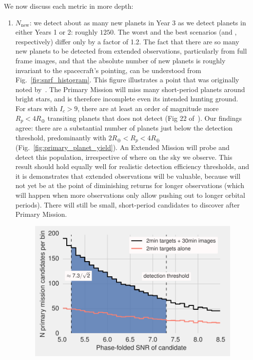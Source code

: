 We now discuss each metric in more depth:
\begin{enumerate}
	\item $N_\mathrm{new}$: we detect about as many new planets in Year 3 as we detect planets in either Years 1 or 2: roughly $1250$.
	The worst and the best scenarios (\elong\:and \hemis, respectively) differ only by a factor of 1.2.
	The fact that there are so many new planets to be detected from extended observations, particularly from full frame images, and that the absolute number of new planets is roughly invariant to the spacecraft's pointing, can be understood from Fig.~\ref{fig:snrf_histogram}.
	This figure illustrates a point that was originally noted by~.
        The \tesss Primary Mission will miss many short-period planets around bright stars, and is therefore
        incomplete even its intended hunting ground.
        For stars with $I_c>9$, there are at least an order of magnitude more $R_p<4R_\oplus$ transiting planets that \tess does not detect (Fig 22 of~).
	Our findings agree: there are a substantial number of planets just below the detection threshold, predominantly with $2R_\oplus < R_p <4R_\oplus$ (Fig.~\ref{fig:primary_planet_yield}).
	An Extended Mission will probe and detect this population, irrespective of where on the sky we observe.
	This result should hold equally well for realistic detection efficiency thresholds, and it is demonstrates that extended observations will be valuable, because \tess will not yet be at the point of diminishing returns for longer observations (which will happen when more observations only allow pushing out to longer orbital periods). 
	There will still be small, short-period candidates to discover after \tesss Primary Mission.
\begin{figure}[!t]
	\centering
	\includegraphics[scale=1.]{figures/snrf_histogram_with_ps.pdf}

\end{figure}
\end{enumerate}
